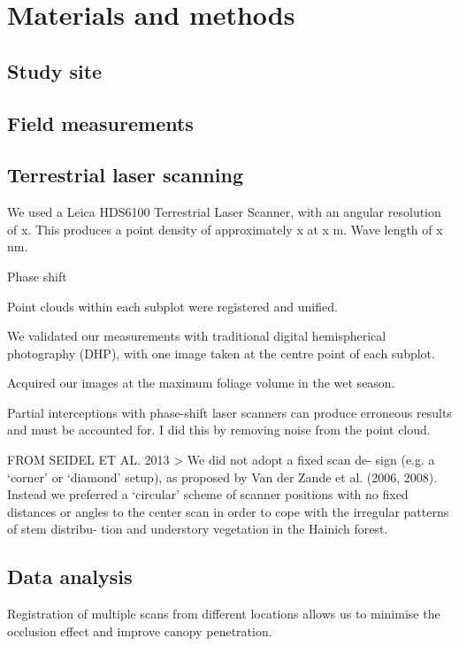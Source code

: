\documentclass[11pt,a4paper]{article}
\begin{document}
\section{Materials and methods}

\subsection{Study site}

\subsection{Field measurements}

\subsection{Terrestrial laser scanning}

We used a Leica HDS6100 Terrestrial Laser Scanner, with an angular resolution of x. This produces a point density of approximately x at x m. Wave length of x nm.

Phase shift

Point clouds within each subplot were registered and unified.

We validated our measurements with traditional digital hemispherical photography (DHP), with one image taken at the centre point of each subplot.

Acquired our images at the maximum foliage volume in the wet season.

Partial interceptions with phase-shift laser scanners can produce erroneous results and must be accounted for. I did this by removing noise from the point cloud.

FROM SEIDEL ET AL. 2013 > We did not adopt a fixed scan de- sign (e.g. a ‘corner’ or ‘diamond’ setup), as proposed by Van der Zande et al. (2006, 2008). Instead we preferred a ‘circular’ scheme of scanner positions with no fixed distances or angles to the center scan in order to cope with the irregular patterns of stem distribu- tion and understory vegetation in the Hainich forest.

\subsection{Data analysis}

Registration of multiple scans from different locations allows us to minimise the occlusion effect and improve canopy penetration.
\end{document}
